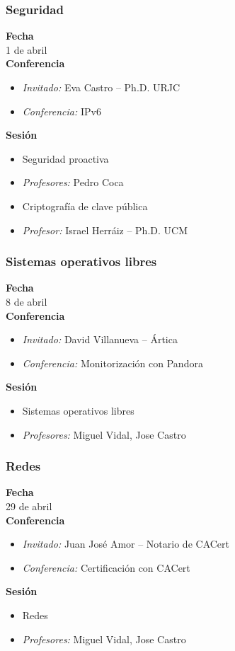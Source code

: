 \documentclass{beamer}
\begin{document}
\begin{frame}
  \frametitle{Seguridad}
  \textbf{Fecha}\\
    1 de abril\\
  \textbf{Conferencia}
    \begin{itemize}
      \item \textit{Invitado:} Eva Castro -- Ph.D. URJC
      \item \textit{Conferencia:} IPv6
    \end{itemize}
  \textbf{Sesión}
    \begin{itemize}
      \item Seguridad proactiva
      \item \textit{Profesores:} Pedro Coca 
    \end{itemize}
    \begin{itemize}
      \item Criptografía de clave pública
      \item \textit{Profesor:} Israel Herráiz -- Ph.D. UCM
    \end{itemize}
\end{frame}

\begin{frame}
  \frametitle{Sistemas operativos libres}
  \textbf{Fecha}\\
    8 de abril\\
  \textbf{Conferencia}
    \begin{itemize}
      \item \textit{Invitado:} David Villanueva -- Ártica
      \item \textit{Conferencia:} Monitorización con Pandora
    \end{itemize}
  \textbf{Sesión}
    \begin{itemize}
      \item Sistemas operativos libres
      \item \textit{Profesores:} Miguel Vidal, Jose Castro
    \end{itemize}
\end{frame}

\begin{frame}
  \frametitle{Redes}
  \textbf{Fecha}\\
    29 de abril\\
  \textbf{Conferencia}
    \begin{itemize}
      \item \textit{Invitado:} Juan José Amor -- Notario de CACert
      \item \textit{Conferencia:} Certificación con CACert
    \end{itemize}
  \textbf{Sesión}
    \begin{itemize}
      \item Redes
      \item \textit{Profesores:} Miguel Vidal, Jose Castro
    \end{itemize}
\end{frame}
\end{document}
